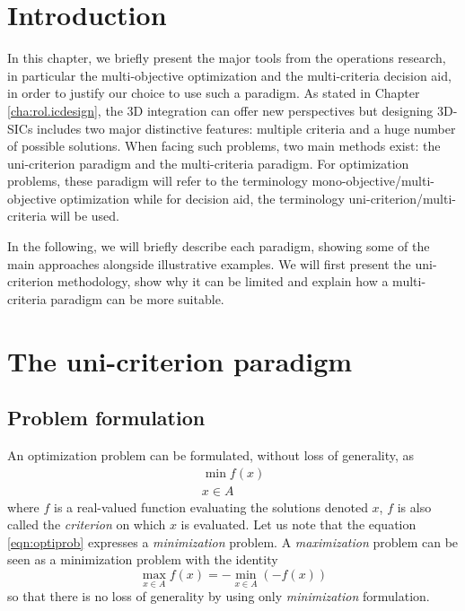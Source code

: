 \label{cha:rol2.mcda}

\begin{summary}
\lipsum[1]
\end{summary}

\section{Introduction}
\label{sec:rol2.intro}
In this chapter, we briefly present the major tools from the operations research, in particular the multi-objective optimization and the multi-criteria decision aid, in order to justify our choice to use such a paradigm. As stated in Chapter \ref{cha:rol.icdesign}, the 3D integration can offer new perspectives but designing 3D-SICs includes two major distinctive features: multiple criteria and a huge number of possible solutions. When facing such problems, two main methods exist: the uni-criterion paradigm and the multi-criteria paradigm. For optimization problems, these paradigm will refer to the terminology mono-objective/multi-objective optimization while for decision aid, the terminology uni-criterion/multi-criteria will be used.

In the following, we will briefly describe each paradigm, showing some of the main approaches alongside illustrative examples. We will first present the uni-criterion methodology, show why it can be limited and explain how a multi-criteria paradigm can be more suitable.

\section{The uni-criterion paradigm}
\label{sec:rol2.unicrit_paradigm}

\subsection{Problem formulation}
An optimization problem can be formulated, without loss of generality, as \cite{BraMar2002}
\begin{equation}
\label{eqn:optiprob}
\begin{gathered}
\min f(x)\\
x \in A
\end{gathered}
\end{equation}
where $f$ is a real-valued function evaluating the solutions denoted $x$, $f$ is also called the \emph{criterion} on which $x$ is evaluated. Let us note that the equation \ref{eqn:optiprob} expresses a \emph{minimization} problem. A \emph{maximization} problem can be seen as a minimization problem with the identity
$$
\max_{x \in A} f(x) = - \min_{x \in A} (-f(x))
$$
so that there is no loss of generality by using only \emph{minimization} formulation.

